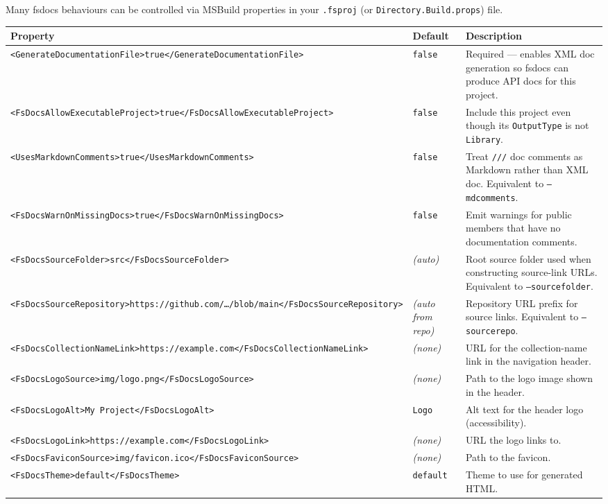 \documentclass{article}
\begin{document}
Many fsdocs behaviours can be controlled via MSBuild properties in your \texttt{.fsproj} (or \texttt{Directory.Build.props}) file.
\begin{tabular}{|l|l|l|}\hline
\textbf{Property} & \textbf{Default} & \textbf{Description}\\ \hline\hline
\texttt{<GenerateDocumentationFile>true</GenerateDocumentationFile>} & \texttt{false} & Required — enables XML doc generation so fsdocs can produce API docs for this project.\\ \hline
\texttt{<FsDocsAllowExecutableProject>true</FsDocsAllowExecutableProject>} & \texttt{false} & Include this project even though its \texttt{OutputType} is not \texttt{Library}.\\ \hline
\texttt{<UsesMarkdownComments>true</UsesMarkdownComments>} & \texttt{false} & Treat \texttt{///} doc comments as Markdown rather than XML doc. Equivalent to \texttt{--mdcomments}.\\ \hline
\texttt{<FsDocsWarnOnMissingDocs>true</FsDocsWarnOnMissingDocs>} & \texttt{false} & Emit warnings for public members that have no documentation comments.\\ \hline
\texttt{<FsDocsSourceFolder>src</FsDocsSourceFolder>} & \emph{(auto)} & Root source folder used when constructing source-link URLs. Equivalent to \texttt{--sourcefolder}.\\ \hline
\texttt{<FsDocsSourceRepository>https://github.com/…/blob/main</FsDocsSourceRepository>} & \emph{(auto from repo)} & Repository URL prefix for source links. Equivalent to \texttt{--sourcerepo}.\\ \hline
\texttt{<FsDocsCollectionNameLink>https://example.com</FsDocsCollectionNameLink>} & \emph{(none)} & URL for the collection-name link in the navigation header.\\ \hline
\texttt{<FsDocsLogoSource>img/logo.png</FsDocsLogoSource>} & \emph{(none)} & Path to the logo image shown in the header.\\ \hline
\texttt{<FsDocsLogoAlt>My Project</FsDocsLogoAlt>} & \texttt{Logo} & Alt text for the header logo (accessibility).\\ \hline
\texttt{<FsDocsLogoLink>https://example.com</FsDocsLogoLink>} & \emph{(none)} & URL the logo links to.\\ \hline
\texttt{<FsDocsFaviconSource>img/favicon.ico</FsDocsFaviconSource>} & \emph{(none)} & Path to the favicon.\\ \hline
\texttt{<FsDocsTheme>default</FsDocsTheme>} & \texttt{default} & Theme to use for generated HTML.\\ \hline

\end{tabular}
\end{document}
